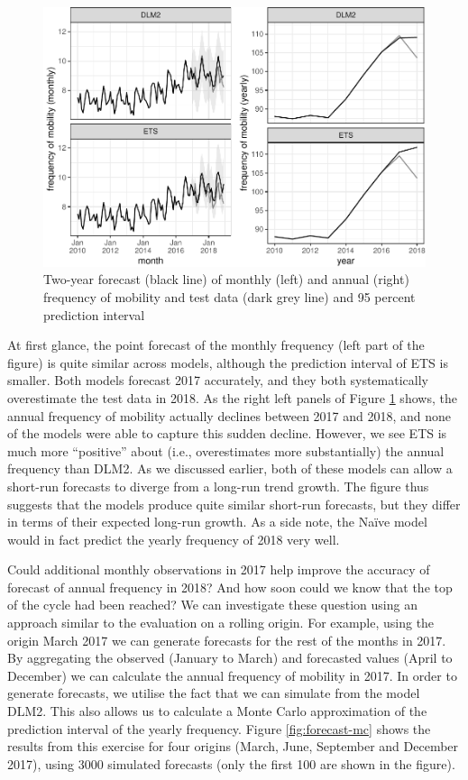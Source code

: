 \documentclass[12pt, a4paper]{article}
\begin{document}
\begin{figure}[H]
  \caption{\label{fig:forecast-2017}Two-year forecast (black line) of monthly
(left) and annual (right) frequency of mobility and test data (dark grey
line) and 95 percent prediction interval}
\centering
\includegraphics[scale = 0.8]{../figs/freq--forecast-2017-1.pdf}
\end{figure}

At first glance, the point forecast of the monthly frequency (left part
of the figure) is quite similar across models, although the prediction
interval of ETS is smaller. Both models forecast 2017 accurately, and
they both systematically overestimate the test data in 2018. As the
right left panels of Figure \ref{fig:forecast-2017} shows, the annual
frequency of mobility actually declines between 2017 and 2018, and none
of the models were able to capture this sudden decline. However, we see
ETS is much more ``positive'' about (i.e., overestimates more
substantially) the annual frequency than DLM2. As we discussed earlier,
both of these models can allow a short-run forecasts to diverge from a
long-run trend growth. The figure thus suggests that the models produce
quite similar short-run forecasts, but they differ in terms of their
expected long-run growth. As a side note, the Naïve model would in fact
predict the yearly frequency of 2018 very well.

Could additional monthly observations in 2017 help improve the accuracy of forecast of annual frequency in 2018? And how soon could we know that the top of the cycle had been reached? We can investigate these question using an approach similar to the evaluation on a rolling origin. For example, using the origin March 2017 we can generate forecasts for the rest of the months in 2017. By aggregating the observed (January to March) and forecasted values (April to December) we can calculate the annual frequency of mobility in 2017. In order to generate forecasts, we utilise the fact that we can simulate from the model DLM2. This also allows us to calculate a Monte Carlo approximation of the prediction interval of the yearly frequency. Figure \ref{fig:forecast-mc} shows the results from this exercise for four origins (March, June, September and December 2017), using 3000 simulated forecasts (only the first 100 are shown in the figure).
\end{document}
